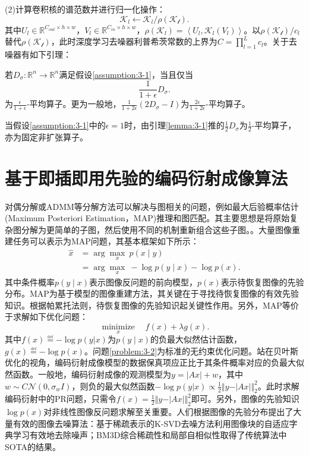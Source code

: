 (2)计算卷积核的谱范数并进行归一化操作：
\begin{equation} \label{equation:3-2}
	\mathcal{K}_l\leftarrow{\mathcal{K}_l/\rho{(\mathcal{K_l})}}.
\end{equation}
其中$U_l\in\mathbb{R}^{C_{out}\times{h}\times{w}}$，$V_l\in\mathbb{R}^{C_{in}\times{h}\times{w}}$，$\rho(\mathcal{K}_l)=\left<{U_l, \mathcal{K}_l(V_l)}\right>$。以$\rho(\mathcal{K_l})/c_l$替代$\rho(\mathcal{K_l})$，此时深度学习去噪器利普希茨常数的上界为$C=\prod_{l=1}^L{c_l}$。关于去噪器有如下引理：
\begin{lemma} \label{lemma:3-1}
	若$D_{\sigma}:\mathbb{R}^n\to\mathbb{R}^n$满足假设\ref{assumption:3-1}，当且仅当
	\begin{equation}
		\frac{1}{1+\epsilon}D_{\sigma}.
	\end{equation}
	为$\frac{\epsilon}{1+\epsilon}$-平均算子。更为一般地，$\frac{1}{1+2\epsilon}(2D_{\sigma}-I)$为$\frac{2\epsilon}{1+2\epsilon}$-平均算子。
\end{lemma}
当假设\ref{assumption:3-1}中的$\epsilon=1$时，由引理\ref{lemma:3-1}推的$\frac{1}{2}D_{\sigma}$为$\frac{1}{2}$-平均算子，亦为固定非扩张算子。

\section{基于即插即用先验的编码衍射成像算法}
对偶分解或ADMM等分解方法可以解决与图相关的问题，例如最大后验概率估计(Maximum Posteriori Estimation，MAP)推理和图匹配。其主要思想是将原始复杂图分解为更简单的子图，然后使用不同的机制重新组合这些子图。。大量图像重建任务可以表示为MAP问题\supercite{ZhangKai,Shunsuke,Stanley}，其基本框架如下所示：
\begin{equation} \label{problem:3-1}
	\begin{aligned} 
		\hat{x}&=\arg\max_{x}\ p(x\;\vert\;y) \\
			   &=\arg\max_{x}\ -\log{p(y\;\vert\;x)-\log{p(x)}}.
	\end{aligned}
\end{equation}
其中条件概率${p(y\;\vert\;x)}$表示图像反问题的前向模型，$p(x)$表示待恢复图像的先验分布。MAP为基于模型的图像重建方法，其关键在于寻找待恢复图像的有效先验知识。根据帕累托法则，待恢复图像的先验知识起关键性作用。另外，MAP等价于求解如下优化问题：
\begin{equation} \label{problem:3-2}
	\mathop{\text{minimize}}\limits_{x}\quad f(x)+\lambda{g(x)}.
\end{equation}
其中$f(x)\overset{\underset{\mathrm{def}}{}}{=}{-\log{p(y\vert{x})}}$为${p(y\;\vert\;x)}$的负最大似然估计函数，$g(x)\overset{\underset{\mathrm{def}}{}}{=}{-\log{p(x)}}$。问题\eqref{problem:3-2}为标准的无约束优化问题。站在贝叶斯优化的视角，编码衍射成像模型的数据保真项应正比于其条件概率对应的负最大似然函数。一般地，编码衍射成像的观测模型为$y=\vert{Ax}\vert+w$，其中$w\sim{C\mathcal{N}(0,\sigma_w{I})}$，则负的最大似然函数$-\log{p(y\vert{x})}\propto\frac{1}{2}{\Vert{y-\vert{Ax}\vert}\Vert_2^2}$。此时求解编码衍射中的PR问题，只需令$f(x)=\frac{1}{2}{\Vert{y-\vert{Ax}\vert}\Vert_2^2}$即可。另外，图像的先验知识$\log{p(x)}$对非线性图像反问题求解至关重要。人们根据图像的先验分布提出了大量有效的图像去噪算法：基于稀疏表示的K-SVD去噪方法利用图像块的自适应字典学习有效地去除噪声；BM3D综合稀疏性和局部自相似性取得了传统算法中SOTA的结果。

